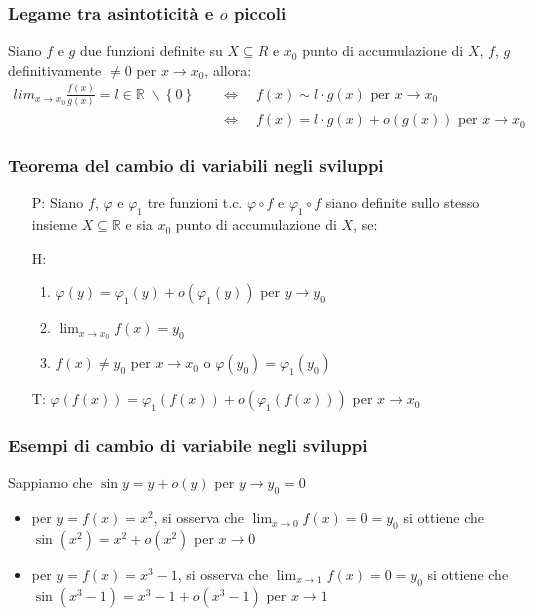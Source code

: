 \documentclass[a4paper]{article}
\begin{document}
\subsubsection*{Legame tra asintoticità e \(o\) piccoli}
Siano \(f\) e \(g\) due funzioni definite su \(X \subseteq R\) e \(x_0\) punto di accumulazione di \(X\), \(f\), \(g\) definitivamente \(\neq 0\) per \(x \to x_0\), allora:
\begin{align*}
	lim_{x \to x_0} \frac{f(x)}{g(x)} = l \in \mathbb{R} \; \backslash \left\{0\right\} \quad &\Leftrightarrow \quad f(x) \sim l \cdot g(x) \text{ per } x \to x_0 \\
	&\Leftrightarrow \quad f(x) = l \cdot g(x) + o(g(x)) \text{ per } x \to x_0
\end{align*}

\subsubsection*{Teorema del cambio di variabili negli sviluppi}
\begin{itemize}
	\item[P:] Siano \(f\), \(\varphi\) e \(\varphi_1\) tre funzioni t.c. \(\varphi \circ f\) e \(\varphi_1 \circ f\) siano definite sullo stesso
	insieme \(X \subseteq \mathbb{R}\) e sia \(x_0\) punto di accumulazione di \(X\), se:
	\item[H:]
	\begin{enumerate}
		\item \(\varphi(y) = \varphi_1(y) + o(\varphi_1(y))\) per \(y \to y_0\)
		\item \(\displaystyle \lim_{x \to x_0} f(x) = y_0\)
		\item \(f(x) \neq y_0\) per \(x \to x_0\) o \(\varphi(y_0) = \varphi_1(y_0)\)
	\end{enumerate}
	\item[T:] \(\varphi(f(x)) = \varphi_1(f(x)) + o(\varphi_1(f(x)))\) per \(x \to x_0\)
\end{itemize}

\subsubsection*{Esempi di cambio di variabile negli sviluppi}
Sappiamo che \(\sin y = y + o(y)\) per \(y \to y_0 = 0\)
\begin{itemize}
	\item per \(y = f(x) = x^2\), si osserva che \(\displaystyle \lim_{x \to 0} f(x) = 0 = y_0\) si ottiene che \\ \(\sin(x^2) = x^2 + o(x^2)\) per \(x \to 0\)
	\item per \(y = f(x) = x^3 - 1\), si osserva che \(\displaystyle \lim_{x \to 1} f(x) = 0 = y_0\) si ottiene che \\ \(\sin(x^3 - 1) = x^3 - 1 + o(x^3 - 1)\) per \(x \to 1\)
\end{itemize}
\end{document}
